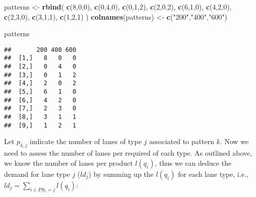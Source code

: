\documentclass[
]{article}
\newenvironment{Shaded}{\begin{snugshade}}{\end{snugshade}}
\newcommand{\DecValTok}[1]{\textcolor[rgb]{0.00,0.00,0.81}{#1}}
\newcommand{\KeywordTok}[1]{\textcolor[rgb]{0.13,0.29,0.53}{\textbf{#1}}}
\newcommand{\NormalTok}[1]{#1}
\newcommand{\StringTok}[1]{\textcolor[rgb]{0.31,0.60,0.02}{#1}}
\begin{document}
\begin{Shaded}
\begin{Highlighting}[]
\NormalTok{patterns <-}\StringTok{ }\KeywordTok{rbind}\NormalTok{(}
\KeywordTok{c}\NormalTok{(}\DecValTok{8}\NormalTok{,}\DecValTok{0}\NormalTok{,}\DecValTok{0}\NormalTok{),}
\KeywordTok{c}\NormalTok{(}\DecValTok{0}\NormalTok{,}\DecValTok{4}\NormalTok{,}\DecValTok{0}\NormalTok{),}
\KeywordTok{c}\NormalTok{(}\DecValTok{0}\NormalTok{,}\DecValTok{1}\NormalTok{,}\DecValTok{2}\NormalTok{),}
\KeywordTok{c}\NormalTok{(}\DecValTok{2}\NormalTok{,}\DecValTok{0}\NormalTok{,}\DecValTok{2}\NormalTok{),}
\KeywordTok{c}\NormalTok{(}\DecValTok{6}\NormalTok{,}\DecValTok{1}\NormalTok{,}\DecValTok{0}\NormalTok{),}
\KeywordTok{c}\NormalTok{(}\DecValTok{4}\NormalTok{,}\DecValTok{2}\NormalTok{,}\DecValTok{0}\NormalTok{),}
\KeywordTok{c}\NormalTok{(}\DecValTok{2}\NormalTok{,}\DecValTok{3}\NormalTok{,}\DecValTok{0}\NormalTok{),}
\KeywordTok{c}\NormalTok{(}\DecValTok{3}\NormalTok{,}\DecValTok{1}\NormalTok{,}\DecValTok{1}\NormalTok{),}
\KeywordTok{c}\NormalTok{(}\DecValTok{1}\NormalTok{,}\DecValTok{2}\NormalTok{,}\DecValTok{1}\NormalTok{)}
\NormalTok{)}
\KeywordTok{colnames}\NormalTok{(patterns) <-}\StringTok{ }\KeywordTok{c}\NormalTok{(}\StringTok{"200"}\NormalTok{,}\StringTok{"400"}\NormalTok{,}\StringTok{"600"}\NormalTok{)}

\NormalTok{patterns}
\end{Highlighting}
\end{Shaded}

\begin{verbatim}
##       200 400 600
##  [1,]   8   0   0
##  [2,]   0   4   0
##  [3,]   0   1   2
##  [4,]   2   0   2
##  [5,]   6   1   0
##  [6,]   4   2   0
##  [7,]   2   3   0
##  [8,]   3   1   1
##  [9,]   1   2   1
\end{verbatim}

Let \(p_{k,j}\) indicate the number of lanes of type \(j\) associated to
pattern \(k\). Now we need to assess the number of lanes per required of
each type. As outlined above, we know the number of lanes per product
\(l(q_i)\), thus we can deduce the demand for lane type \(j\) (\(ld_j\))
by summing up the \(l(q_i)\) for each lane type, i.e.,
\(ld_j = \sum_{i \in P|b_i=j} l(q_i)\):
\end{document}
